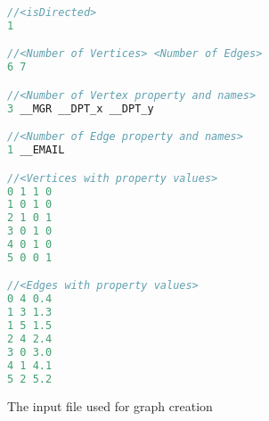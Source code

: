 
\begin{figure}
  \begin{center}
\begin{lstlisting}[language=C++,basicstyle=\tiny]
//<isDirected>
1

//<Number of Vertices> <Number of Edges>
6 7

//<Number of Vertex property and names>
3 __MGR __DPT_x __DPT_y

//<Number of Edge property and names>
1 __EMAIL

//<Vertices with property values>
0 1 1 0
1 0 1 0 
2 1 0 1
3 0 1 0
4 0 1 0 
5 0 0 1

//<Edges with property values>
0 4 0.4
1 3 1.3
1 5 1.5
2 4 2.4
3 0 3.0
4 1 4.1
5 2 5.2
\end{lstlisting}
  \end{center}
  \caption{The input file used for graph creation}
  \label{fig:motiv_4}
\end{figure}

